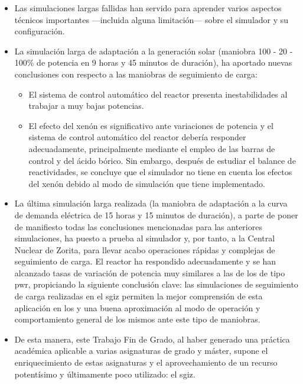 \begin{itemize}
\begin{itemize}
    \end{itemize} 
    \item Las simulaciones largas fallidas han servido para aprender varios aspectos técnicos importantes ---incluida alguna limitación--- sobre el simulador y su configuración.
    \item La simulación larga de adaptación a la generación solar (maniobra 100 - 20 - 100\% de potencia en 9 horas y 45 minutos de duración), ha aportado nuevas conclusiones con respecto a las maniobras de seguimiento de carga:
    \begin{itemize}
        \item El sistema de control automático del reactor presenta inestabilidades al trabajar a muy bajas potencias.
        \item El efecto del xenón es significativo ante variaciones de potencia y el sistema de control automático del reactor debería responder adecuadamente, principalmente mediante el empleo de las barras de control y del ácido bórico. Sin embargo, después de estudiar el balance de reactividades, se concluye que el simulador no tiene en cuenta los efectos del xenón debido al modo de simulación que tiene implementado.
    \end{itemize} 
    \item La última simulación larga realizada (la maniobra de adaptación a la curva de demanda eléctrica de 15 horas y 15 minutos de duración), a parte de poner de manifiesto todas las conclusiones mencionadas para las anteriores simulaciones, ha puesto a prueba al simulador y, por tanto, a la Central Nuclear de Zorita, para llevar acabo operaciones rápidas y complejas de seguimiento de carga. El reactor ha respondido adecuadamente y se han alcanzado tasas de variación de potencia muy similares a las de los  de tipo \acrshort{pwr}, propiciando la siguiente conclusión clave: las simulaciones de seguimiento de carga realizadas en el \acrshort{sgiz} permiten la mejor comprensión de esta aplicación en los  y una buena aproximación al modo de operación y comportamiento general de los mismos ante este tipo de maniobras.
    \item De esta manera, este Trabajo Fin de Grado, al haber generado una práctica académica aplicable a varias asignaturas de grado y máster, supone el enriquecimiento de estas asignaturas y el aprovechamiento de un recurso potentísimo y últimamente poco utilizado: el \acrshort{sgiz}.
\end{itemize}

